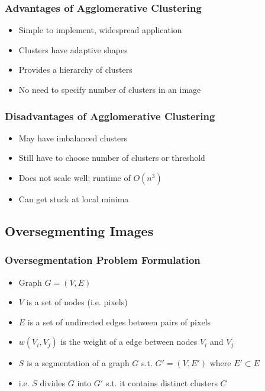 \documentclass[letterpaper,12pt]{article}
\begin{document}
\subsubsection{Advantages of Agglomerative Clustering}
\begin{itemize}
 \item Simple to implement, widespread application
 \item Clusters have adaptive shapes
 \item Provides a hierarchy of clusters
 \item No need to specify number of clusters in an image
\end{itemize}

\subsubsection{Disadvantages of Agglomerative Clustering}
\begin{itemize}
 \item May have imbalanced clusters
 \item Still have to choose number of clusters or threshold
 \item Does not scale well; runtime of $O(n^3)$
 \item Can get stuck at local minima
\end{itemize}


\subsection{Oversegmenting Images}
\subsubsection{Oversegmentation Problem Formulation}
\begin{itemize}
 \item Graph $G = (V,E)$
 \item $V$ is a set of nodes (i.e. pixels)
 \item $E$ is a set of undirected edges between pairs of pixels
 \item $w(V_i, V_j)$ is the weight of a edge between nodes $V_i$ and $V_j$
 \item $S$ is a segmentation of a graph $G$ s.t. $G' = (V,E')$ where $E' \subset E$
 \item i.e. $S$ divides $G$ into $G'$ s.t. it contains distinct clusters $C$
\end{itemize}
\end{document}
